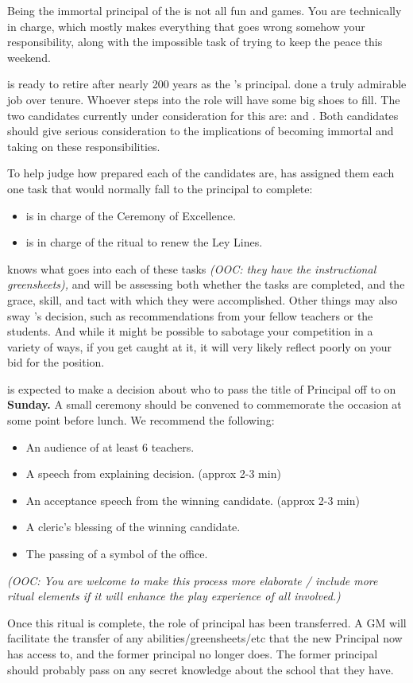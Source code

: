 \documentclass[green]{GL2020}
\begin{document}
\name{\gNewPrincipal{}}

Being the immortal principal of the \pSchool{} is not all fun and games. You are technically in charge, which mostly makes everything that goes wrong somehow your responsibility, along with the impossible task of trying to keep the peace this weekend.

\cPrincipal{\full} is ready to retire after nearly 200 years as the \pSc{}’s principal. \cPrincipal{\They}  done a truly admirable job over \cPrincipal{\their} tenure. Whoever steps into the role will have some big shoes to fill. The two candidates currently under consideration for this are: \cMusic{\full} and \cBeetle{\full}. Both candidates should give serious consideration to the implications of becoming immortal and taking on these responsibilities.

To help judge how prepared each of the candidates are, \cPrincipal{} has assigned them each one task that would normally fall to the principal to complete:
\begin{itemize}
  \item \cMusic{} is in charge of the Ceremony of Excellence.
  \item \cBeetle{} is in charge of the ritual to renew the Ley Lines.
\end{itemize}

\cPrincipal{} knows what goes into each of these tasks \emph{(OOC: they have the instructional greensheets),} and will be assessing both whether the tasks are completed, and the grace, skill, and tact with which they were accomplished. Other things may also sway \cPrincipal{}’s decision, such as recommendations from your fellow teachers or the students. And while it might be possible to sabotage your competition in a variety of ways, if you get caught at it, it will very likely reflect poorly on your bid for the position.

\cPrincipal{} is expected to make a decision about who to pass the title of Principal off to on \textbf{Sunday.} A small ceremony should be convened to commemorate the occasion at some point before lunch. We recommend the following:
\begin{itemize}
  \item An audience of at least 6 teachers.
  \item A speech from \cPrincipal{} explaining \cPrincipal{\their} decision. (approx 2-3 min)
  \item An acceptance speech from the winning candidate. (approx 2-3 min)
  \item A cleric’s blessing of the winning candidate.
  \item The passing of a symbol of the office.
\end{itemize}

\emph{(OOC: You are welcome to make this process more elaborate / include more ritual elements if it will enhance the play experience of all involved.)}

Once this ritual is complete, the role of principal has been transferred. A GM will facilitate the transfer of any abilities/greensheets/etc that the new Principal now has access to, and the former principal no longer does. The former principal should probably pass on any secret knowledge about the school that they have.
\end{document}
